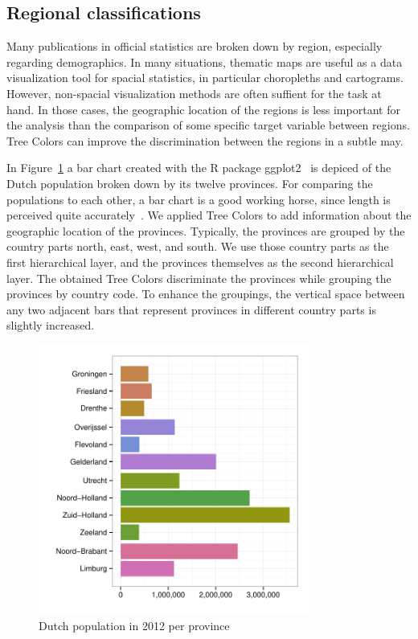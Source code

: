 \documentclass[journal]{vgtc}                %
\begin{document}
\subsection{Regional classifications}
Many publications in official statistics are broken down by region, especially regarding demographics.
In many situations, thematic maps are useful as a data visualization tool for spacial statistics, in particular choropleths and cartograms. However, non-spacial visualization methods are often suffient for the task at hand. In those cases, the geographic location of the regions is less important for the analysis than the comparison of some specific target variable between regions. Tree Colors can improve the discrimination between the regions in a subtle may.

In Figure~\ref{fig:barApp} a bar chart created with the R package ggplot2~\cite{ggplot2} is depiced of the Dutch population broken down by its twelve provinces. For comparing the populations to each other, a bar chart is a good working horse, since length is perceived quite accurately~\cite{Mackinlay1986}. We applied Tree Colors to add information about the geographic location of the provinces. Typically, the provinces are grouped by the country parts north, east, west, and south. We use those country parts as the first hierarchical layer, and the provinces themselves as the second hierarchical layer. The obtained Tree Colors discriminate the provinces while grouping the provinces by country code. To enhance the groupings, the vertical space between any two adjacent bars that represent provinces in different country parts is slightly increased.

\begin{figure}[tb]
  \centering
  \includegraphics[width=3.5in]{pop_bar.pdf}

  \caption{Dutch population in 2012 per province}\label{fig:barApp}

\end{figure}
\end{document}
